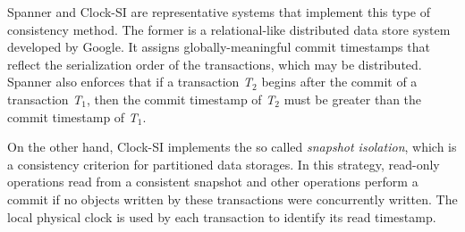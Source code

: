 Spanner \cite{Corbett:2013} and Clock-SI \cite{Du2013} are representative systems that implement this type of consistency method. The former is a relational-like distributed data store system developed by Google. It assigns globally-meaningful commit timestamps that reflect the serialization order of the transactions, which may be distributed. Spanner also enforces that if a transaction \textit{T$_{2}$} begins after the commit of a transaction \textit{T$_{1}$}, then the commit timestamp of \textit{T$_{2} $} must be greater than the commit timestamp of \textit{T$_{1}$}.


On the other hand, Clock-SI implements the so called \textit{snapshot isolation}, which is a consistency criterion for partitioned data storages. In this strategy, read-only operations read from a consistent snapshot and other operations perform a commit if no objects written by these transactions were
concurrently written. The local physical clock is used by each transaction to identify its read timestamp.
\vspace{1mm}


